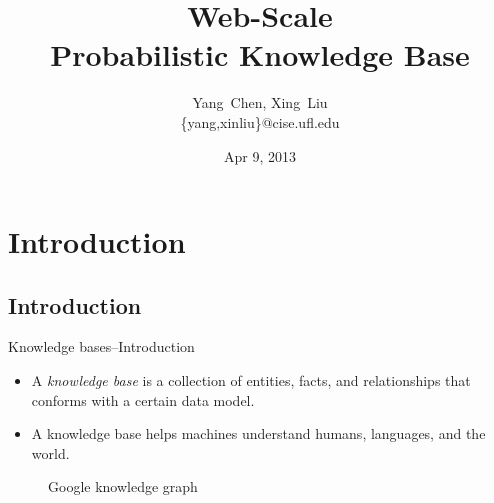 \documentclass[onlymath,xcolor=pdftex,dvipsnames,table]{beamer}
\title[\probkb Web-Scale Probabilistic Knowledge Base]%
{\probkb Web-Scale\\Probabilistic Knowledge Base}
\author %
{Yang~Chen, Xing~Liu\\{\footnotesize{\{yang,xinliu\}@cise.ufl.edu}}}
\institute[University of Florida] %
{
  Computer and Information Science and Engineering\\
  University of Florida\\
}
\date{Apr 9, 2013} %
\let\oldemph\emph
\renewcommand{\emph}[1]{{\color{Blue}\oldemph{#1}}}
\begin{document}
\maketitle

\section{Introduction}
\subsection{Introduction}
\begin{frame}{Knowledge bases--Introduction}
\begin{itemize}
  \item A \emph{knowledge base} is a collection of entities, facts, and
    relationships that conforms with a certain data model.
  \item A knowledge base helps machines understand humans, languages,
    and the world.
\end{itemize}
\begin{figure}
  \centering
  \caption{Google knowledge graph}
\end{figure}
\end{frame}
\end{document}
